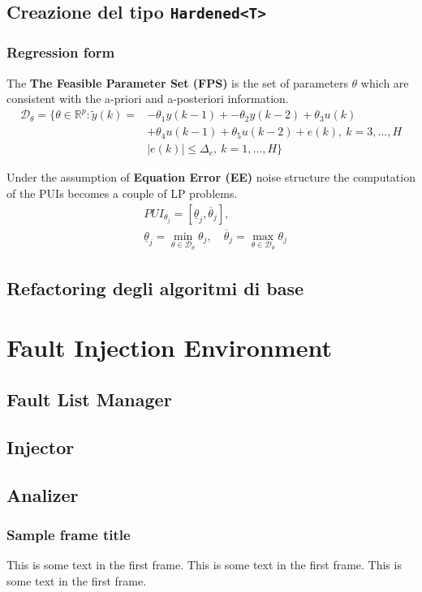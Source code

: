 \documentclass[aspectratio=169]{beamer}
\begin{document}
    \subsection{Creazione del tipo \texttt{Hardened<T>}}
    \begin{frame}
        \frametitle{Regression form}
        \begin{definition}
            The \textbf{The Feasible Parameter Set (FPS)} is the set of parameters $\theta$ which are consistent with the a-priori and a-posteriori information.
            \begin{equation}
                \begin{aligned}
                    \mathcal{D}_\theta=\{
                        \theta\in\mathbb{R}^p: 
                        \tilde{y}(k)=&-\theta_1{y(k-1)}+
                        -\theta_2{y(k-2)}+\theta_3{u(k)}\\
                        &+\theta_4{u(k-1)}+\theta_5{u(k-2)}+e(k), \ k=3,...,H \\
                        & \vert e(k) \vert \le \Delta_e, \
                        k=1,...,H
                     \}
                \end{aligned}
            \end{equation}
        \end{definition}
        Under the assumption of \textbf{Equation Error (EE)} noise structure the computation of the PUIs becomes a couple of LP problems. 
        \begin{align}
            &PUI_{\theta_j}=[\underline{\theta}_j,\overline{\theta}_j],\\
            &\underline{\theta}_j=\min_{\theta\in\mathcal{D}_\theta} {\theta_j}, \quad
            \overline{\theta}_j=\max_{\theta\in\mathcal{D}_\theta} {\theta_j}
        \end{align}
        
    \end{frame}
    \subsection{Refactoring degli algoritmi di base}

    
    \section{Fault Injection Environment}

    \subsection{Fault List Manager}
    \subsection{Injector}
    \subsection{Analizer}

    \begin{frame}
        \frametitle{Sample frame title}
        This is some text in the first frame. This is some text in the first frame. This is some text in the first frame.
        \end{frame}
\end{document}
